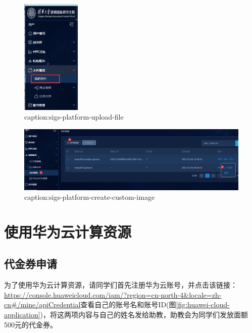 \begin{figure}[htbp]
	\centering
	\includegraphics[width=0.25\textwidth]{figures/sigs-platform-upload-file.png}
	\caption{caption:sigs-platform-upload-file}
	\label{fig:sigs-platform-upload-file}
\end{figure}


\begin{figure}[htbp]
	\centering
	\includegraphics[width=1\textwidth]{figures/sigs-platform-create-custom-image.png}
	\caption{caption:sigs-platform-create-custom-image}
	\label{fig:sigs-platform-create-custom-image}
\end{figure}



\section{使用华为云计算资源}\label{sec:huawei-cloud-usage}


\subsection{代金券申请}

为了使用华为云计算资源，请同学们首先注册华为云账号，并点击该链接：
\url{https://console.huaweicloud.com/iam/?region=cn-north-4&locale=zh-cn#/mine/apiCredential}查看自己的账号名和账号ID(图\ref{fig:huawei-cloud-application})，将这两项内容与自己的姓名发给助教，助教会为同学们发放面额500元的代金券。

